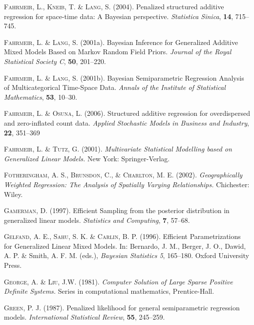 \documentclass[11pt,a4paper,twoside]{bayesxarticle}
\begin{document}
\begin{thebibliography}{99}
 {\scshape Fahrmeir, L., Kneib, T. \& Lang, S.} (2004).
 Penalized structured additive regression for space-time data: A Bayesian perspective.
 {\it Statistica Sinica}, {\bf 14}, 715--745.

 {\scshape Fahrmeir, L. \& Lang, S.} (2001a).
 Bayesian Inference for Generalized Additive Mixed Models Based on Markov Random Field Priors.
 {\it Journal of the Royal Statistical Society C}, {\bf 50}, 201--220.

 {\scshape Fahrmeir, L. \& Lang, S.} (2001b).
 Bayesian Semiparametric Regression Analysis of Multicategorical Time-Space Data.
 {\it Annals of the Institute of Statistical Mathematics}, {\bf 53}, 10--30.

 {\scshape Fahrmeir, L. \& Osuna, L.} (2006).
 Structured additive regression for overdispersed and zero-inflated count data.
 {\it Applied Stochastic Models in Business and Industry}, {\bf 22}, 351--369

 {\scshape Fahrmeir, L. \& Tutz, G.} (2001).
 {\it Multivariate Statistical Modelling based on Generalized Linear Models.}
 New York: Springer-Verlag.

 {\scshape Fotheringham, A. S., Brunsdon, C., \& Charlton, M. E.} (2002).
 {\it Geographically Weighted Regression: The Analysis of Spatially Varying Relationships.}
 Chichester: Wiley.

 {\scshape Gamerman, D.} (1997).
 Efficient Sampling from the posterior distribution in generalized linear models.
 {\it Statistics and Computing}, {\bf 7}, 57--68.

 {\scshape Gelfand, A. E., Sahu, S. K. \& Carlin, B. P.} (1996).
 Efficient Parametrizations for Genera\-lized Linear Mixed Models.
 In: Bernardo, J. M., Berger, J. O., Dawid, A. P. \& Smith, A. F. M. (eds.),
 {\it Bayesian Statistics 5}, 165--180.
 Oxford University Press.

 {\scshape George, A. \& Liu, J.W.} (1981).
 {\it Computer Solution of Large Sparse Positive Definite Systems.}
 Series in computational mathematics, Prentice-Hall.

 {\scshape Green, P. J.} (1987).
 Penalized likelihood for general semiparametric regression models.
 {\it International Statistical Review}, {\bf 55}, 245--259.


\end{thebibliography}
\end{document}
